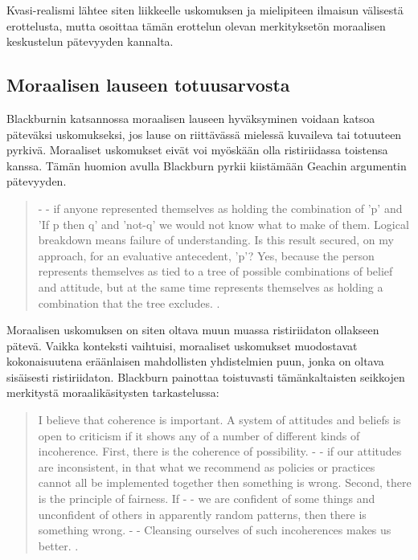 \documentclass[a4paper,12pt,times,titlepage,finnish]{article}
\begin{document}
Kvasi-realismi lähtee siten liikkeelle uskomuksen ja mielipiteen ilmaisun välisestä erottelusta, mutta osoittaa tämän erottelun olevan merkityksetön moraalisen keskustelun pätevyyden kannalta. 

\subsection{Moraalisen lauseen totuusarvosta}

Blackburnin katsannossa moraalisen lauseen hyväksyminen voidaan katsoa pä\-te\-väk\-si uskomukseksi, jos lause on riittävässä mielessä kuvaileva tai totuuteen pyrkivä. Moraaliset uskomukset eivät voi myöskään olla ristiriidassa toistensa kanssa. Tä\-män huomion avulla Blackburn pyrkii kiistämään Geachin argumentin pätevyyden.

\begin{quote}
	- - if anyone represented themselves as holding the combination of 'p' and 'If p then q' and 'not-q' we would not know what to make of them. Logical breakdown means failure of understanding. Is this result secured, on my approach, for an evaluative antecedent, 'p'? Yes, because the person represents themselves as tied to a tree of possible combinations of belief and attitude, but at the same time represents themselves as holding a combination that the tree excludes. \citep[72]{Blackburn98}.
\end{quote}

Moraalisen uskomuksen on siten oltava muun muassa ristiriidaton ollakseen pätevä. Vaikka konteksti vaihtuisi, moraaliset uskomukset muodostavat kokonaisuutena eräänlaisen mahdollisten yhdistelmien puun, jonka on oltava sisäisesti ristiriidaton. Blackburn painottaa toistuvasti tämänkaltaisten seikkojen merkitystä moraalikäsitysten tarkastelussa:

\begin{quote}
	I believe that coherence is important. A system of attitudes and beliefs is open to criticism if it shows any of a number of different kinds of incoherence. First, there is the coherence of possibility. - - if our attitudes are inconsistent, in that what we recommend as policies or practices cannot all be implemented together then something is wrong. Second, there is the principle of fairness. If - - we are confident of some things and unconfident of others in apparently random patterns, then there is something wrong. - - Cleansing ourselves of such incoherences makes us better.  \citep[309-310]{Blackburn98}.
\end{quote}
\end{document}
